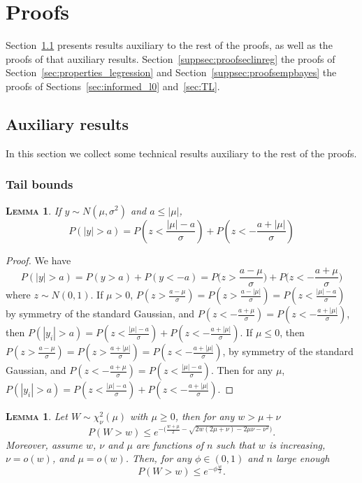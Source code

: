 \documentclass[
  12pt]{article}
\newtheorem{lem}[thm]{\textsc{Lemma}}
\begin{document}
\section{Proofs}\label{app:proofs}


Section~\ref{suppsec:auxiliary} presents results auxiliary to the rest of the proofs, as well as the proofs of that auxiliary results. Section~\ref{suppsec:proofseclinreg} the proofs of Section~\ref{sec:properties_legression} and Section~\ref{suppsec:proofsempbayes} the proofs of Sections~\ref{sec:informed_l0} and~\ref{sec:TL}. 

\subsection{Auxiliary results}\label{suppsec:auxiliary}

In this section we collect some technical results auxiliary to the rest of the proofs.

\subsubsection{Tail bounds}

\begin{lem}\label{lemma:3tailbounds}
If $y\sim N(\mu,\sigma^2)$ and $a\leq|\mu|$, $$P(|y|>a)  = P\left(z<\frac{|\mu|-a}{\sigma}\right) + P\left(z<-\frac{a+|\mu|}{\sigma}\right)$$
\end{lem}

\begin{proof} We have
$$P(|y|>a) = P(y>a) + P(y<-a) = P\Big(z>\frac{a-\mu}{\sigma}\Big) + P\Big(z<-\frac{a+\mu}{\sigma}\Big)$$
where $z\sim N(0,1)$. If $\mu>0$, $P(z>\frac{a-\mu}{\sigma})  =  P(z>\frac{a-|\mu|}{\sigma})= P(z<\frac{|\mu|-a}{\sigma})$ by symmetry of the standard Gaussian, and $P(z<-\frac{a+\mu}{\sigma})=P(z<-\frac{a+|\mu|}{\sigma})$, then $P(|y_i|>a) =  P(z<\frac{|\mu|-a}{\sigma}) + P(z<-\frac{a+|\mu|}{\sigma})$.
If $\mu\leq0$, then $P(z>\frac{a-\mu}{\sigma})=P(z>\frac{a+|\mu|}{\sigma})=P(z<-\frac{a+|\mu|}{\sigma})$, by symmetry of the standard Gaussian, and $P(z<-\frac{a+\mu}{\sigma})=P(z<\frac{|\mu|-a}{\sigma})$. Then for any $\mu$, $P(|y_i|>a)  = P(z<\frac{|\mu|-a}{\sigma}) + P(z<-\frac{a+|\mu|}{\sigma}) $.
\end{proof}


\begin{lem}\label{lemma:s1s3}
Let $W\sim\chi_{\nu}^2(\mu)$ with $\mu \geq 0$, then for any $w>\mu+\nu$
$$P(W > w) \leq e^{-\big(\frac{w+\mu}{2}  - \sqrt{2w( 2 \mu+ \nu)-2 \mu \nu - \nu^2 } \big)}. $$
Moreover, assume $w$, $\nu$ and $\mu$ are functions of $n$ such that $w$ is increasing, $\nu=o(w)$, and $\mu=o(w)$. Then, for any $\phi\in(0,1)$ and $n$ large enough
$$P(W > w)  \leq  e^{-\phi\frac{w}{2}}.$$
\end{lem}
\end{document}
